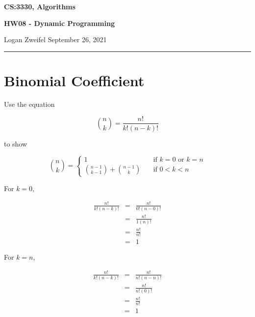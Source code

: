 \documentclass[11pt]{article}
\begin{document}
\thispagestyle{empty}

\begin{center}
\bf\large CS:3330, Algorithms
\end{center}

\begin{center}
\bf\large HW08 - Dynamic Programming  %
\end{center}

\noindent
Logan Zweifel     %
\hfill
September 26, 2021           %

\noindent
\rule{\textwidth}{1pt}

\medskip


\section{Binomial Coefficient}
Use the equation

\begin{equation*}
\binom{n}{k} = \frac{n!}{k!(n-k)!}
\end{equation*}

to show

\[ \binom{n}{k} = 
	\begin{cases}
		1		& \quad \text{if } k=0 \text{ or $k=n$} \\
		\binom{n-1}{k-1}+\binom{n-1}{k}	& \quad \text{if } 0<k<n \text{ }
	\end{cases}
\]

\bigskip
\bigskip

For $k=0$,

\begin{eqnarray*}
\frac{n!}{k!(n-k)!} &=& \frac{n!}{0!(n-0)!} \\
	&=& \frac{n!}{1(n)!} \\
	&=& \frac{n!}{n!} \\
	&=& 1
\end{eqnarray*}

\bigskip
\bigskip
\bigskip

For $k=n$,

\begin{eqnarray*}
\frac{n!}{k!(n-k)!} &=& \frac{n!}{n!(n-n)!} \\
	&=& \frac{n!}{n!(0)!} \\
	&=& \frac{n!}{n!} \\
	&=& 1
\end{eqnarray*}
\end{document}
